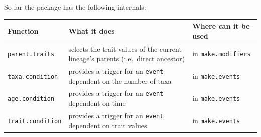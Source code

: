 \documentclass[
]{book}
\begin{document}
So far the package has the following internals:

\begin{longtable}[]{@{}lll@{}}
\toprule
\begin{minipage}[b]{0.20\columnwidth}\raggedright
Function\strut
\end{minipage} & \begin{minipage}[b]{0.28\columnwidth}\raggedright
What it does\strut
\end{minipage} & \begin{minipage}[b]{0.43\columnwidth}\raggedright
Where can it be used\strut
\end{minipage}\tabularnewline
\midrule
\endhead
\begin{minipage}[t]{0.20\columnwidth}\raggedright
\texttt{parent.traits}\strut
\end{minipage} & \begin{minipage}[t]{0.28\columnwidth}\raggedright
selects the trait values of the current lineage's parents (i.e.~direct ancestor)\strut
\end{minipage} & \begin{minipage}[t]{0.43\columnwidth}\raggedright
in \texttt{make.modifiers}\strut
\end{minipage}\tabularnewline
\begin{minipage}[t]{0.20\columnwidth}\raggedright
\texttt{taxa.condition}\strut
\end{minipage} & \begin{minipage}[t]{0.28\columnwidth}\raggedright
provides a trigger for an \texttt{event} dependent on the number of taxa\strut
\end{minipage} & \begin{minipage}[t]{0.43\columnwidth}\raggedright
in \texttt{make.events}\strut
\end{minipage}\tabularnewline
\begin{minipage}[t]{0.20\columnwidth}\raggedright
\texttt{age.condition}\strut
\end{minipage} & \begin{minipage}[t]{0.28\columnwidth}\raggedright
provides a trigger for an \texttt{event} dependent on time\strut
\end{minipage} & \begin{minipage}[t]{0.43\columnwidth}\raggedright
in \texttt{make.events}\strut
\end{minipage}\tabularnewline
\begin{minipage}[t]{0.20\columnwidth}\raggedright
\texttt{trait.condition}\strut
\end{minipage} & \begin{minipage}[t]{0.28\columnwidth}\raggedright
provides a trigger for an \texttt{event} dependent on trait values\strut
\end{minipage} & \begin{minipage}[t]{0.43\columnwidth}\raggedright
in \texttt{make.events}\strut
\end{minipage}\tabularnewline
\bottomrule
\end{longtable}
\end{document}
